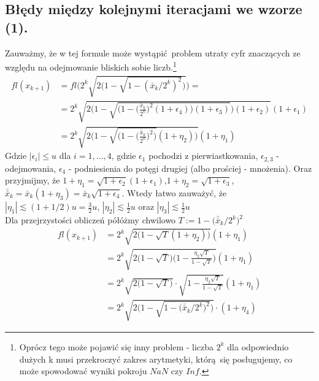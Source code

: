 \documentclass[10pt,wide]{mwart}
\theoremstyle{definition}
\begin{document}
\subsection{Błędy między kolejnymi iteracjami we wzorze (1).}
Zauważmy, że w tej formule może wystąpić problem utraty cyfr znaczących ze względu na odejmowanie bliskich sobie liczb.\footnote{
Oprócz tego może pojawić się inny problem -
liczba \(2^k\) dla odpowiednio dużych k musi przekroczyć zakres arytmetyki, którą się posługujemy, co może spowodować wyniki pokroju \(NaN\) czy \(Inf\).}
\begin{equation*}
\begin{split}
fl(x_{k+1}) & = fl\Bigg( 2^{k}\sqrt{2\Big(1 - \sqrt{1 - (\bar{x}_{k}/2^{k})^2}\Big)} \Bigg) = \\ & = 2^{k}\sqrt{2\Bigg(1 - \sqrt{\bigg(1 - \Big(\frac{\bar{x}_{k}}{2^{k}}\Big)^2(1+\epsilon_4)\bigg)(1+\epsilon_3)}\Bigg)(1 + \epsilon_2)}(1+\epsilon_1) \\
& = 2^{k}\sqrt{2\Bigg(1 - \sqrt{\bigg(1 - \Big(\frac{\bar{\bar{x}}_{k}}{2^{k}}\Big)^2\bigg)}(1+\eta_2)\Bigg)}(1+\eta_1)
\end{split}
\end{equation*}
  Gdzie \(|\epsilon_i| \leq u \) dla \(i = 1,...,4\), gdzie \(\epsilon_1\) pochodzi z pierwiastkowania, \(\epsilon_{2,3}\) - odejmowania, \(\epsilon_4\) - podniesienia do potęgi drugiej (albo prościej - mnożenia).
  Oraz przyjmijmy, że \( 1 + \eta_1 = \sqrt{1 + \epsilon_2}(1+\epsilon_1)\),\(1 + \eta_2 = \sqrt{1+\epsilon_3}\), \(\bar{\bar{x}}_k = \bar{x}_k(1+\eta_3) = \bar{x}_k\sqrt{1+\epsilon_4}\).
  Wtedy łatwo zauważyć, że \(|\eta_1| \lesssim (1 + 1/2)u = \frac{3}{2}u\), \(|\eta_2| \lesssim \frac{1}{2}u\) oraz \(|\eta_3| \lesssim \frac{1}{2}u\)
  \\ Dla przejrzystości obliczeń półóżmy chwilowo \(T := 1 - \Big(\bar{\bar{x}}_k/2^k\Big)^2 \)
  \begin{equation*}
  \begin{split}
  fl(x_{k+1}) & = 2^{k}\sqrt{2\Bigg(1 - \sqrt{T}(1+\eta_2)\Bigg)}(1+\eta_1) \\
  & = 2^{k}\sqrt{2\bigg(1 - \sqrt{T}\bigg)\bigg(1 - \frac{\eta_2\sqrt{T}}{1 - \sqrt{T}}\bigg)}(1+\eta_1) \\
  & = 2^k\sqrt{2\bigg(1-\sqrt{T}\bigg)} \cdot \sqrt{1 - \frac{\eta_2\sqrt{T}}{1 - \sqrt{T}}}(1+\eta_1) \\
  & = 2^k\sqrt{2\bigg(1-\sqrt{1 - \Big(\bar{\bar{x}}_k/2^k\Big)^2}\bigg)}\cdot(1 + \eta_4)
  \end{split}
  \end{equation*}
\end{document}
